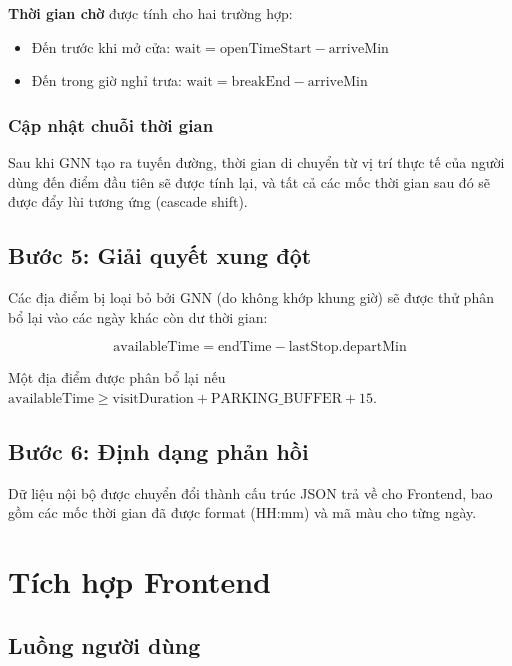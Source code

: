 \documentclass[12pt,a4paper]{report}
\begin{document}
\textbf{Thời gian chờ} được tính cho hai trường hợp:
\begin{itemize}
    \item Đến trước khi mở cửa: $\text{wait} = \text{openTimeStart} - \text{arriveMin}$
    \item Đến trong giờ nghỉ trưa: $\text{wait} = \text{breakEnd} - \text{arriveMin}$
\end{itemize}

\subsubsection{Cập nhật chuỗi thời gian}
Sau khi GNN tạo ra tuyến đường, thời gian di chuyển từ vị trí thực tế của người dùng đến điểm đầu tiên sẽ được tính lại, và tất cả các mốc thời gian sau đó sẽ được đẩy lùi tương ứng (cascade shift).

\subsection{Bước 5: Giải quyết xung đột}

Các địa điểm bị loại bỏ bởi GNN (do không khớp khung giờ) sẽ được thử phân bổ lại vào các ngày khác còn dư thời gian:

\begin{equation}
\text{availableTime} = \text{endTime} - \text{lastStop.departMin}
\end{equation}

Một địa điểm được phân bổ lại nếu $\text{availableTime} \geq \text{visitDuration} + \text{PARKING\_BUFFER} + 15$.

\subsection{Bước 6: Định dạng phản hồi}

Dữ liệu nội bộ được chuyển đổi thành cấu trúc JSON trả về cho Frontend, bao gồm các mốc thời gian đã được format (HH:mm) và mã màu cho từng ngày.

\section{Tích hợp Frontend}

\subsection{Luồng người dùng}
\end{document}
